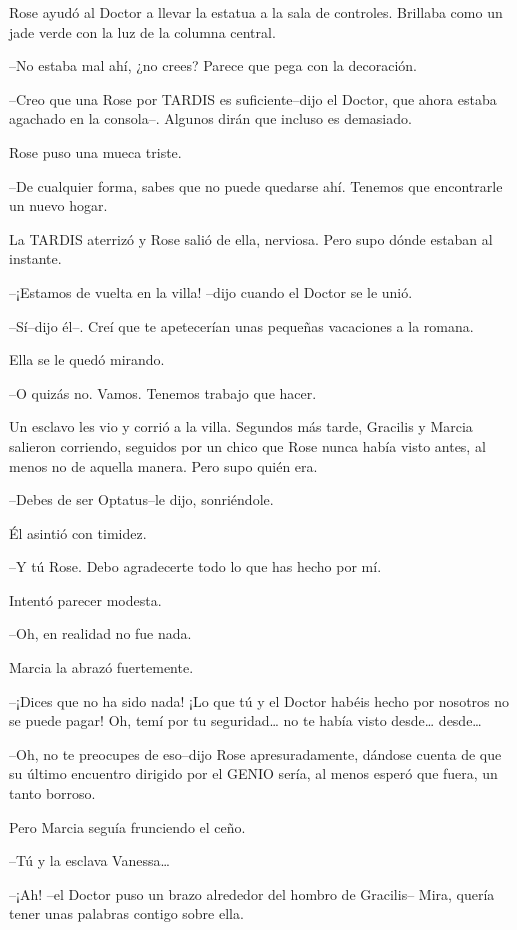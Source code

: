 Rose ayudó al Doctor a llevar la estatua a la sala de controles.
Brillaba como un jade verde con la luz de la columna central.

--No estaba mal ahí, ¿no crees? Parece que pega con la decoración.

--Creo que una Rose por TARDIS es suficiente--dijo el Doctor, que ahora
estaba agachado en la consola--. Algunos dirán que incluso es demasiado.

Rose puso una mueca triste.

--De cualquier forma, sabes que no puede quedarse ahí. Tenemos que
encontrarle un nuevo hogar.

La TARDIS aterrizó y Rose salió de ella, nerviosa. Pero supo dónde
estaban al instante.

--¡Estamos de vuelta en la villa! --dijo cuando el Doctor se le unió.

--Sí--dijo él--. Creí que te apetecerían unas pequeñas vacaciones a la
romana.

Ella se le quedó mirando.

--O quizás no. Vamos. Tenemos trabajo que hacer.

Un esclavo les vio y corrió a la villa. Segundos más tarde, Gracilis y
Marcia salieron corriendo, seguidos por un chico que Rose nunca había
visto antes, al menos no de aquella manera. Pero supo quién era.

--Debes de ser Optatus--le dijo, sonriéndole.

Él asintió con timidez.

--Y tú Rose. Debo agradecerte todo lo que has hecho por mí.

Intentó parecer modesta.

--Oh, en realidad no fue nada.

Marcia la abrazó fuertemente.

--¡Dices que no ha sido nada! ¡Lo que tú y el Doctor habéis hecho por
nosotros no se puede pagar! Oh, temí por tu seguridad\ldots{} no te
había visto desde\ldots{} desde\ldots{}

--Oh, no te preocupes de eso--dijo Rose apresuradamente, dándose cuenta
de que su último encuentro dirigido por el GENIO sería, al menos esperó
que fuera, un tanto borroso.

Pero Marcia seguía frunciendo el ceño.

--Tú y la esclava Vanessa\ldots{}

--¡Ah! --el Doctor puso un brazo alrededor del hombro de Gracilis--
Mira, quería tener unas palabras contigo sobre ella.

